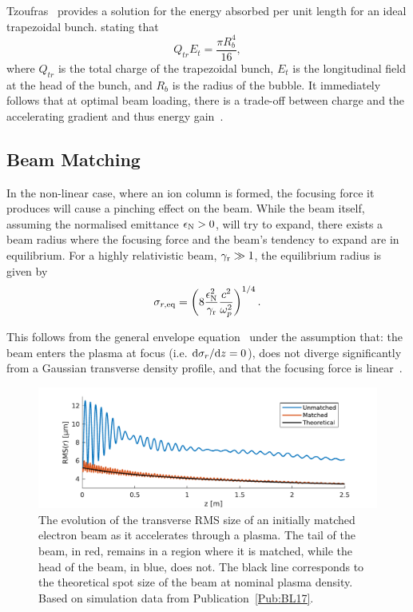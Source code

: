 Tzoufras \etal ~provides a solution for the energy absorbed per unit length for an ideal trapezoidal bunch. stating that
\begin{equation}
    Q_{tr}E_{t} = \frac{\pi R_{b}^{4}}{16}, \label{EQ:Trapez}
\end{equation}
where $Q_{tr}$ is the total charge of the trapezoidal bunch, $E_{t}$ is the longitudinal field at the head of the bunch, and $R_{b}$ is the radius of the bubble.
It immediately follows that at optimal beam loading, there is a trade-off between charge and the accelerating gradient and thus energy gain~\cite{tzoufras:2009}.

\subsection{Beam Matching}
\label{Int:BPI:Match}

In the non-linear case, where an ion column is formed, the focusing force it produces will cause a pinching effect on the beam.
While the beam itself, assuming the normalised emittance $\epsilon_{\mathrm{N}} > 0$, will try to expand, there exists a beam radius where the focusing force and the beam's tendency to expand are in equilibrium.
For a highly relativistic beam, $\gamma_{\mathrm{r}} \gg 1$, the equilibrium radius is given by~\cite{krall:1995}
\begin{equation}
    \sigma_{r,\mathrm{eq}} = \left( 8 \frac{\epsilon_{\mathrm{N}}^2}{\gamma_{\mathrm{r}}} \frac{c^2}{\omega_{p}^2} \right)^{1/4}. \label{EQ:BMatch}
\end{equation}

This follows from the general envelope equation~\cite{lee:1976} under the assumption that: the beam enters the plasma at focus (i.e. $\mathrm{d}\sigma_{r}/\mathrm{d} z = 0$), does not diverge significantly from a Gaussian transverse density profile, and that the focusing force is linear~\cite{krall:1995}.

\begin{figure}[hbt]
    \centering
    \includegraphics[width=0.875\linewidth,trim={0mm 0mm 0mm 0mm},clip]{figures/BeamMatching}
    \caption{\label{Fig:BPI:Match}
        The evolution of the transverse RMS size of an initially matched electron beam as it accelerates through a plasma.
        The tail of the beam, in red, remains in a region where it is matched, while the head of the beam, in blue, does not.
        The black line corresponds to the theoretical spot size of the beam at nominal plasma density.
        Based on simulation data from Publication~\ref{Pub:BL17}.
    }
\end{figure}

